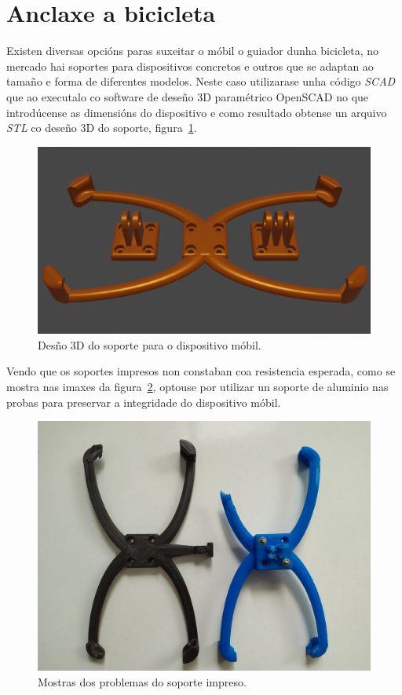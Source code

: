 \section{Anclaxe a bicicleta}
Existen diversas opcións paras suxeitar o móbil o guiador dunha bicicleta, no mercado hai soportes para dispositivos concretos e outros que se adaptan ao tamaño e forma de diferentes modelos. Neste caso utilizarase unha código \emph{SCAD} que ao executalo co software de deseño 3D paramétrico OpenSCAD no que introdúcense as dimensións do dispositivo e como resultado obtense un arquivo \emph{STL} co deseño 3D do soporte, figura~\ref{fig:soporte_mobil}.
\begin{figure}[tb]
  \centering
  \includegraphics[scale=.2]{imaxes/soporte-mobil.png}
  \caption{Desño 3D do soporte para o dispositivo móbil.}
  \label{fig:soporte_mobil}
\end{figure}
Vendo que os soportes impresos non constaban coa resistencia esperada, como se mostra nas imaxes da figura~\ref{fig:fallos_soporte}, optouse por utilizar un soporte de aluminio nas probas para preservar a integridade do dispositivo móbil.
\begin{figure}[tb]
  \centering
  \includegraphics[scale=.08]{imaxes/fallos-soporte.jpg}
  \caption{Mostras dos problemas do soporte impreso.}
  \label{fig:fallos_soporte}
\end{figure}
